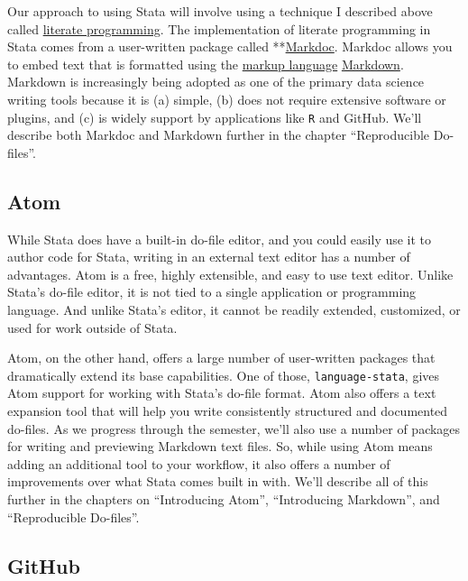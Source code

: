 \documentclass[]{book}
\theoremstyle{definition}
\theoremstyle{definition}
\theoremstyle{remark}
\begin{document}
Our approach to using Stata will involve using a technique I described
above called
\href{https://en.wikipedia.org/wiki/Literate_programming}{literate
programming}. The implementation of literate programming in Stata comes
from a user-written package called
**\href{http://haghish.com/statistics/stata-blog/reproducible-research/markdoc.php}{Markdoc}.
Markdoc allows you to embed text that is formatted using the
\href{https://en.wikipedia.org/wiki/Markup_language}{markup language}
\href{https://daringfireball.net/projects/markdown/}{Markdown}. Markdown
is increasingly being adopted as one of the primary data science writing
tools because it is (a) simple, (b) does not require extensive software
or plugins, and (c) is widely support by applications like \texttt{R}
and GitHub. We'll describe both Markdoc and Markdown further in the
chapter ``Reproducible Do-files''.

\subsection{Atom}\label{atom}

While Stata does have a built-in do-file editor, and you could easily
use it to author code for Stata, writing in an external text editor has
a number of advantages. Atom is a free, highly extensible, and easy to
use text editor. Unlike Stata's do-file editor, it is not tied to a
single application or programming language. And unlike Stata's editor,
it cannot be readily extended, customized, or used for work outside of
Stata.

Atom, on the other hand, offers a large number of user-written packages
that dramatically extend its base capabilities. One of those,
\texttt{language-stata}, gives Atom support for working with Stata's
do-file format. Atom also offers a text expansion tool that will help
you write consistently structured and documented do-files. As we
progress through the semester, we'll also use a number of packages for
writing and previewing Markdown text files. So, while using Atom means
adding an additional tool to your workflow, it also offers a number of
improvements over what Stata comes built in with. We'll describe all of
this further in the chapters on ``Introducing Atom'', ``Introducing
Markdown'', and ``Reproducible Do-files''.

\subsection{GitHub}\label{github}
\end{document}
